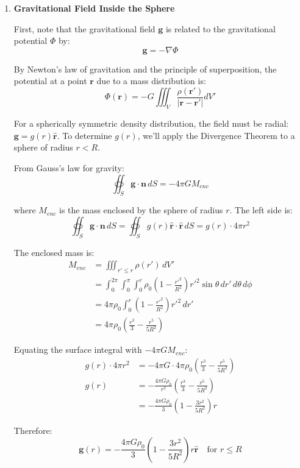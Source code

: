 \begin{example}
\begin{solution}
\begin{enumerate}
    \item \textbf{Gravitational Field Inside the Sphere}
    
    First, note that the gravitational field $\mathbf{g}$ is related to the gravitational potential $\Phi$ by:
    \[
    \mathbf{g} = -\nabla\Phi
    \]
    
    By Newton's law of gravitation and the principle of superposition, the potential at a point $\mathbf{r}$ due to a mass distribution is:
    \[
    \Phi(\mathbf{r}) = -G\iiint_V \frac{\rho(\mathbf{r'})}{|\mathbf{r} - \mathbf{r'}|} dV'
    \]
    
    For a spherically symmetric density distribution, the field must be radial: $\mathbf{g} = g(r)\hat{\mathbf{r}}$. To determine $g(r)$, we'll apply the Divergence Theorem to a sphere of radius $r < R$.
    
    From Gauss's law for gravity:
    \[
    \oiint_S \mathbf{g} \cdot \mathbf{n} \, dS = -4\pi G M_{enc}
    \]
    
    where $M_{enc}$ is the mass enclosed by the sphere of radius $r$. The left side is:
    \[
    \oiint_S \mathbf{g} \cdot \mathbf{n} \, dS = \oiint_S g(r)\hat{\mathbf{r}} \cdot \hat{\mathbf{r}} \, dS = g(r) \cdot 4\pi r^2
    \]
    
    The enclosed mass is:
    \[
    \begin{aligned}
    M_{enc} &= \iiint_{r' \leq r} \rho(r') \, dV' \\
    &= \int_0^{2\pi} \int_0^{\pi} \int_0^r \rho_0\left(1 - \frac{r'^2}{R^2}\right)r'^2 \sin\theta \, dr' \, d\theta \, d\phi \\
    &= 4\pi\rho_0 \int_0^r \left(1 - \frac{r'^2}{R^2}\right)r'^2 \, dr' \\
    &= 4\pi\rho_0 \left(\frac{r^3}{3} - \frac{r^5}{5R^2}\right)
    \end{aligned}
    \]
    
    Equating the surface integral with $-4\pi G M_{enc}$:
    \[
    \begin{aligned}
    g(r) \cdot 4\pi r^2 &= -4\pi G \cdot 4\pi\rho_0 \left(\frac{r^3}{3} - \frac{r^5}{5R^2}\right) \\
    g(r) &= -\frac{4\pi G\rho_0}{r^2} \left(\frac{r^3}{3} - \frac{r^5}{5R^2}\right) \\
    &= -\frac{4\pi G\rho_0}{3}\left(1 - \frac{3r^2}{5R^2}\right)r
    \end{aligned}
    \]
    
    Therefore:
    \[
    \mathbf{g}(r) = -\frac{4\pi G\rho_0}{3}\left(1 - \frac{3r^2}{5R^2}\right)r\hat{\mathbf{r}} \quad \text{for } r \leq R
    \]
    

\end{enumerate}
\end{solution}
\end{example}
